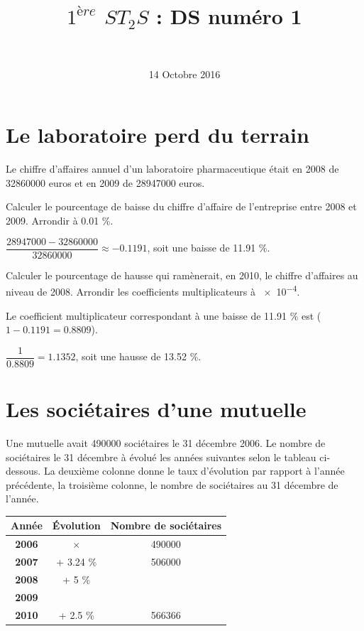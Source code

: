 \documentclass[a4paper,11pt]{exam}
\author{\ }
\date{14 Octobre 2016}
\title{$1^{ère}$ $ST_2S$ : DS num\'ero 1}
\begin{document}
%	

	\maketitle

\section{Le laboratoire perd du terrain}

Le chiffre d'affaires annuel d'un laboratoire pharmaceutique était en 2008 de \num{32860000} euros et en 2009 de \num{28947000} euros.
\begin{questions}
	\question Calculer le pourcentage de baisse du chiffre d'affaire de l'entreprise entre 2008 et 2009. Arrondir à \num{0.01} \%.
	\begin{solution}
		$\dfrac{\num{28947000} - \num{32860000}}{\num{32860000}} \approx \num{-0.1191}$, soit une baisse de \num{11.91} \%.
	\end{solution}
	
	\question Calculer le pourcentage de hausse qui ramènerait, en 2010, le chiffre d'affaires au niveau de 2008. Arrondir les coefficients multiplicateurs à \num{e-4}.
	\begin{solution}
		Le coefficient multiplicateur correspondant à une baisse de \num{11.91} \% est ($1-\num{0.1191} = \num{0.8809}$).
		
		$\dfrac{1}{\num{0.8809}} = \num{1.1352}$, soit une hausse de \num{13.52} \%.
	\end{solution}
\end{questions}
	


\section{Les sociétaires d'une mutuelle}

Une mutuelle avait \num{490000} sociétaires le 31 décembre 2006. Le nombre de sociétaires le 31 décembre à évolué les années suivantes selon le tableau ci-dessous. La deuxième colonne donne le taux d'évolution par rapport à l'année précédente, la troisième colonne, le nombre de sociétaires au 31 décembre de l'année.\\



\begin{tabular}{|c|c|c|}
	\hline
	\textbf{Année} & \textbf{\'Evolution} & \textbf{Nombre de sociétaires} \\
	\hline
	\textbf{2006} & {\LARGE $\times$} & \num{490000} \\
	\hline
	\textbf{2007} & + \num{3.24} \% & \num{506000}\\
	\hline
	\textbf{2008} & + \num{5} \% & \\
	\hline
	\textbf{2009} & &  \\
	\hline
	\textbf{2010} & + \num{2.5} \% & \num{566366} \\
	\hline
	
\end{tabular}
\end{document}
